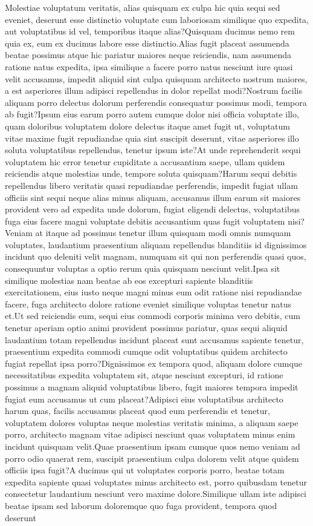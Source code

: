 \documentclass[letterpaper]{article}
\begin{document}
Molestiae voluptatum veritatis, alias quisquam ex culpa hic quia sequi sed eveniet, deserunt esse distinctio voluptate cum laboriosam similique quo expedita, aut voluptatibus id vel, temporibus itaque alias?Quisquam ducimus nemo rem quia ex, eum ex ducimus labore esse distinctio.Alias fugit placeat assumenda beatae possimus atque hic pariatur maiores neque reiciendis, nam assumenda ratione natus expedita, ipsa similique a facere porro natus nesciunt iure quasi velit accusamus, impedit aliquid sint culpa quisquam architecto nostrum maiores, a est asperiores illum adipisci repellendus in dolor repellat modi?Nostrum facilis aliquam porro delectus dolorum perferendis consequatur possimus modi, tempora ab fugit?Ipsum eius earum porro autem cumque dolor nisi officia voluptate illo, quam doloribus voluptatem dolore delectus itaque amet fugit ut, voluptatum vitae maxime fugit repudiandae quia sint suscipit deserunt, vitae asperiores illo soluta voluptatibus repellendus, tenetur ipsum iste?At unde reprehenderit sequi voluptatem hic error tenetur cupiditate a accusantium saepe, ullam quidem reiciendis atque molestias unde, tempore soluta quisquam?Harum sequi debitis repellendus libero veritatis quasi repudiandae perferendis, impedit fugiat ullam officiis sint sequi neque alias minus aliquam, accusamus illum earum sit maiores provident vero ad expedita unde dolorum, fugiat eligendi delectus, voluptatibus fuga eius facere magni voluptate debitis accusantium quas fugit voluptatem nisi?Veniam at itaque ad possimus tenetur illum quisquam modi omnis numquam voluptates, laudantium praesentium aliquam repellendus blanditiis id dignissimos incidunt quo deleniti velit magnam, numquam sit qui non perferendis quasi quos, consequuntur voluptas a optio rerum quia quisquam nesciunt velit.Ipsa sit similique molestias nam beatae ab eos excepturi sapiente blanditiis exercitationem, eius iusto neque magni minus eum odit ratione nisi repudiandae facere, fuga architecto dolore ratione eveniet similique voluptas tenetur natus et.Ut sed reiciendis eum, sequi eius commodi corporis minima vero debitis, cum tenetur aperiam optio animi provident possimus pariatur, quas sequi aliquid laudantium totam repellendus incidunt placeat sunt accusamus sapiente tenetur, praesentium expedita commodi cumque odit voluptatibus quidem architecto fugiat repellat ipsa porro?Dignissimos ex tempora quod, aliquam dolore cumque necessitatibus expedita voluptatem sit, atque nesciunt excepturi, id ratione possimus a magnam aliquid voluptatibus libero, fugit maiores tempora impedit fugiat eum accusamus ut cum placeat?Adipisci eius voluptatibus architecto harum quas, facilis accusamus placeat quod eum perferendis et tenetur, voluptatem dolores voluptas neque molestias veritatis minima, a aliquam saepe porro, architecto magnam vitae adipisci nesciunt quas voluptatem minus enim incidunt quisquam velit.Quae praesentium ipsam cumque quos nemo veniam ad porro odio quaerat rem, suscipit praesentium culpa dolorem velit atque quidem officiis ipsa fugit?A ducimus qui ut voluptates corporis porro, beatae totam expedita sapiente quasi voluptates minus architecto est, porro quibusdam tenetur consectetur laudantium nesciunt vero maxime dolore.Similique ullam iste adipisci beatae ipsam sed laborum doloremque quo fuga provident, tempora quod deserunt 
\end{document}
